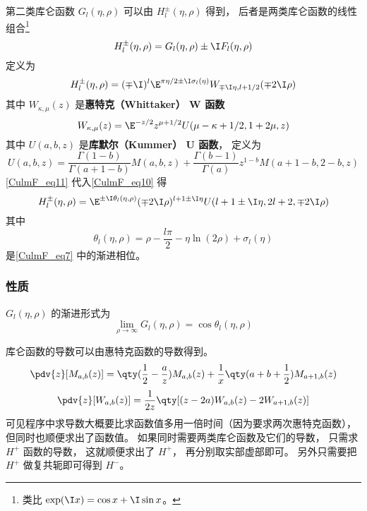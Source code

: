 第二类库仑函数 $G_l(\eta, \rho)$ 可以由 $H_l^\pm(\eta, \rho)$ 得到， 后者是两类库仑函数的线性组合\footnote{类比 $\exp(\I x) = \cos x + \I\sin x$。}
\begin{equation}
H_l^\pm(\eta, \rho) = G_l(\eta, \rho) \pm \I F_l(\eta, \rho)
\end{equation}	
定义为
\begin{equation}\label{CulmF_eq10}
H_l^\pm(\eta, \rho) = (\mp\I)^l \E^{\pi\eta/2 \pm \I \sigma_l(\eta)} W_{\mp\I\eta, l + 1/2}(\mp 2\I\rho)
\end{equation}
其中 $W_{\kappa, \mu}(z)$ 是\textbf{惠特克（Whittaker） W 函数}
\begin{equation}\label{CulmF_eq11}
W_{\kappa, \mu}(z) = \E^{-z/2} z^{\mu + 1/2} U(\mu - \kappa + 1/2, 1 + 2\mu, z)
\end{equation}
其中 $U(a, b, z)$ 是\textbf{库默尔（Kummer） U 函数}， 定义为
\begin{equation}
U(a, b, z) = \frac{\Gamma(1 - b)}{\Gamma(a + 1 - b)} M(a, b, z) + \frac{\Gamma(b - 1)}{\Gamma(a)} z^{1 - b} M(a + 1 - b, 2 - b, z)
\end{equation}
\autoref{CulmF_eq11} 代入\autoref{CulmF_eq10} 得
\begin{equation}
H_l^\pm(\eta, \rho) = \E^{\pm\I\theta_l(\eta, \rho)}(\mp 2\I\rho)^{l + 1 \pm\I\eta} U(l + 1 \pm \I\eta, 2l + 2, \mp2\I\rho)
\end{equation}
其中
\begin{equation}
\theta_l(\eta, \rho) = \rho - \frac{l\pi}{2} - \eta\ln(2\rho) + \sigma_l(\eta)
\end{equation}
是\autoref{CulmF_eq7} 中的渐进相位。

\subsubsection{性质}
$G_l(\eta,\rho)$ 的渐进形式为
\begin{equation}
\lim_{\rho\to \infty} G_l(\eta, \rho) = \cos\theta_l(\eta, \rho)
\end{equation}

库仑函数的导数可以由惠特克函数的导数得到。
\begin{equation}
\pdv{z} [M_{a, b}(z)] = \qty(\frac12 - \frac{a}{z}) M_{a, b}(z) + \frac{1}{x} \qty(a + b + \frac12) M_{a+1, b}(z)
\end{equation}
\begin{equation}
\pdv{z} [W_{a, b}(z)] = \frac{1}{2z} \qty[(z - 2a) W_{a, b}(z) - 2W_{a+1, b}(z)]
\end{equation}
可见程序中求导数大概要比求函数值多用一倍时间（因为要求两次惠特克函数）， 但同时也顺便求出了函数值。 如果同时需要两类库仑函数及它们的导数， 只需求 $H^+$ 函数的导数， 这就顺便求出了 $H^+$， 再分别取实部虚部即可。 另外只需要把 $H^+$ 做复共轭即可得到 $H^-$。

